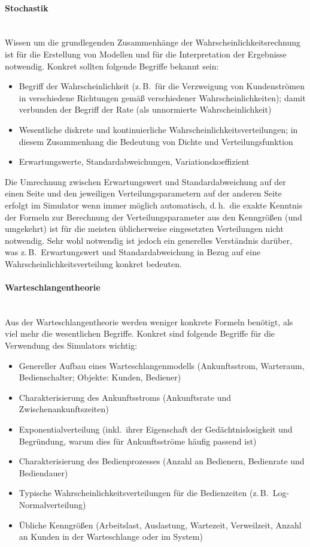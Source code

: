 \documentclass[deutsch]{svmono}
\begin{document}
\paragraph{Stochastik}~\\
Wissen um die grundlegenden Zusammenhänge der Wahrscheinlichkeitsrechnung ist für die Erstellung von Modellen und für die Interpretation der Ergebnisse notwendig. Konkret sollten folgende Begriffe bekannt sein:

\begin{itemize}
\item
Begriff der Wahrscheinlichkeit (z.\,B.\ für die Verzweigung von Kundenströmen in verschiedene Richtungen gemäß verschiedener Wahrscheinlichkeiten); damit verbunden der Begriff der Rate (als unnormierte Wahrscheinlichkeit)
\item
Wesentliche diskrete und kontinuierliche Wahrscheinlichkeitsverteilungen; in diesem Zusammenhang die Bedeutung von Dichte und Verteilungsfunktion
\item
Erwartungswerte, Standardabweichungen, Variationskoeffizient
\end{itemize}

Die Umrechnung zwischen Erwartungswert und Standardabweichung auf der einen Seite und den jeweiligen Verteilungsparametern auf der anderen Seite erfolgt im Simulator wenn immer möglich automatisch, d.\,h.\ die exakte Kenntnis der Formeln zur Berechnung der Verteilungsparameter aus den Kenngrößen (und umgekehrt) ist für die meisten üblicherweise eingesetzten Verteilungen nicht notwendig. Sehr wohl notwendig ist jedoch ein generelles Verständnis darüber, was z.\,B.\ Erwartungswert und Standardabweichung in Bezug auf eine Wahrscheinlichkeitsverteilung konkret bedeuten.

\paragraph{Warteschlangentheorie}~\\
Aus der Warteschlangentheorie werden weniger konkrete Formeln benötigt, als viel mehr die wesentlichen Begriffe. Konkret sind folgende Begriffe für die Verwendung des Simulators wichtig:

\begin{itemize}
\item
Genereller Aufbau eines Warteschlangenmodells (Ankunftsstrom, Warteraum, Bedienschalter; Objekte: Kunden, Bediener)
\item
Charakterisierung des Ankunftsstroms (Ankunftsrate und Zwischenankunftszeiten)
\item
Exponentialverteilung (inkl.\ ihrer Eigenschaft der Gedächtnislosigkeit und Begründung, warum dies für Ankunftsströme häufig passend ist)
\item
Charakterisierung des Bedienprozesses (Anzahl an Bedienern, Bedienrate und Bediendauer)
\item
Typische Wahrscheinlichkeitsverteilungen für die Bedienzeiten (z.\,B.\ Log-Normalverteilung)
\item
Übliche Kenngrößen (Arbeitslast, Auslastung, Wartezeit, Verweilzeit, Anzahl an Kunden in der Warteschlange oder im System)
\end{itemize}
\end{document}
